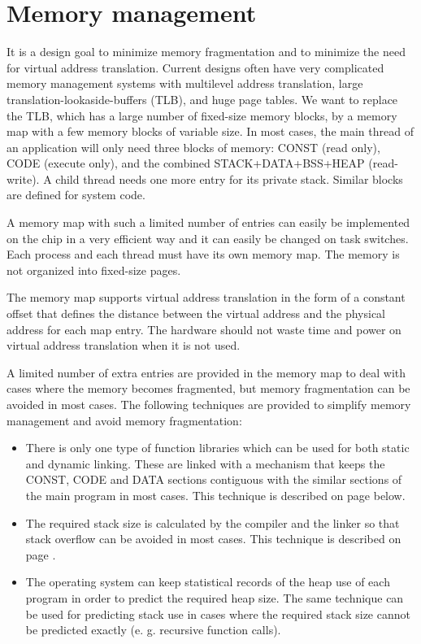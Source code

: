 \documentclass[forwardcom.tex]{subfiles}
\begin{document}
\section{Memory management} \label{memoryManagement}
It is a design goal to minimize memory fragmentation and to minimize the need for virtual address translation. Current designs often have very complicated memory management systems with multilevel address translation, large translation-lookaside-buffers (TLB), and huge page tables. We want to replace the TLB, which has a large number of fixed-size memory blocks, by a memory map with a few memory blocks of variable size. In most cases, the main thread of an application will only need three blocks of memory: CONST (read only), CODE (execute only), and the combined STACK+DATA+BSS+HEAP (read-write). A child thread needs one more entry for its private stack. Similar blocks are defined for system code. 
\vspace{2mm}

A memory map with such a limited number of entries can easily be implemented on the chip in a very efficient way and it can easily be changed on task switches. Each process and each thread must have its own memory map. The memory is not organized into fixed-size pages. 
\vspace{2mm}

The memory map supports virtual address translation in the form of a constant offset that defines the distance between the virtual address and the physical address for each map entry. The hardware should not waste time and power on virtual address translation when it is not used.
\vspace{2mm}

A limited number of extra entries are provided in the memory map to deal with cases where the memory becomes fragmented, but memory fragmentation can be avoided in most cases. The following techniques are provided to simplify memory management and avoid memory fragmentation:

\begin{itemize}
\item There is only one type of function libraries which can be used for both static and dynamic linking. These are linked with a mechanism that keeps the CONST, CODE and DATA sections contiguous with the similar sections of the main program in most cases. This technique is described on page \pageref{libraryLinkMethods} below.

\item The required stack size is calculated by the compiler and the linker so that stack overflow can be avoided in most cases. This technique is described on page \pageref{predictingStackSize}.

\item The operating system can keep statistical records of the heap use of each program in order to predict the required heap size. The same technique can be used for predicting stack use in cases where the required stack size cannot be predicted exactly (e. g. recursive function calls). 
\end{itemize}
\end{document}
